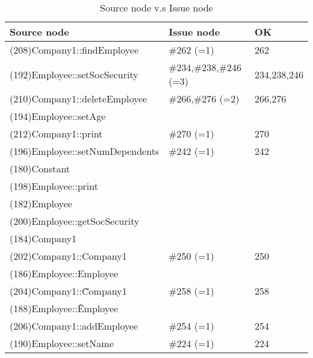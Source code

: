 \begin{table}[hb]
\begin{center}
\begin{tabular}{|l|l|l|}
\hline
Source node & Issue node  & OK\\
\hline
(208)Company1::findEmployee & \#262 (=1) & 262\\
(192)Employee::setSocSecurity & \#234,\#238,\#246 (=3) & 234,238,246\\
(210)Company1::deleteEmployee & \#266,\#276 (=2) & 266,276\\
(194)Employee::setAge &  & \\
(212)Company1::print & \#270 (=1) & 270\\
(196)Employee::setNumDependents & \#242 (=1) & 242\\
(180)Constant &  & \\
(198)Employee::print &  & \\
(182)Employee &  & \\
(200)Employee::getSocSecurity &  & \\
(184)Company1 &  & \\
(202)Company1::Company1 & \#250 (=1) & 250\\
(186)Employee::Employee &  & \\
(204)Company1::\~Company1 & \#258 (=1) & 258 \\
(188)Employee::\~Employee &  & \\
(206)Company1::addEmployee & \#254 (=1) & 254\\
(190)Employee::setName & \#224 (=1) & 224\\
\hline
\end{tabular}
\caption{Source node v.s Issue node}
\end{center}
\end{table}

%
